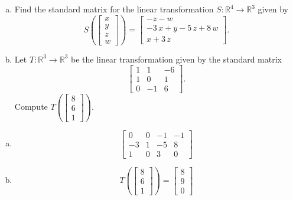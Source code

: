 
\begin{exerciseStatement}

\begin{enumerate}[(a)]
\item Find the standard matrix for the linear transformation \(S:\mathbb{R}^ 4  \to \mathbb{R}^ 3 \) given by \[S\left(  \left[\begin{array}{c}
x \\
y \\
z \\
{w}
\end{array}\right]  \right) =  \left[\begin{array}{c}
-z - {w} \\
-3 \, x + y - 5 \, z + 8 \, {w} \\
x + 3 \, z
\end{array}\right] .\]
\item Let \(T:\mathbb{R}^ 3  \to \mathbb{R}^ 3 \) be the linear transformation given by the standard matrix \[ \left[\begin{array}{ccc}
1 & 1 & -6 \\
1 & 0 & 1 \\
0 & -1 & 6
\end{array}\right] .\] Compute \(T\left( \left[\begin{array}{c}
8 \\
6 \\
1
\end{array}\right]  \right)\). 
\end{enumerate}
    
\end{exerciseStatement}
    
\begin{exerciseAnswer} 

\begin{enumerate}[(a)]
\item \[ \left[\begin{array}{cccc}
0 & 0 & -1 & -1 \\
-3 & 1 & -5 & 8 \\
1 & 0 & 3 & 0
\end{array}\right] \]
\item \[T\left( \left[\begin{array}{c}
8 \\
6 \\
1
\end{array}\right]  \right)= \left[\begin{array}{c}
8 \\
9 \\
0
\end{array}\right] \]
\end{enumerate}
    
\end{exerciseAnswer}
    
